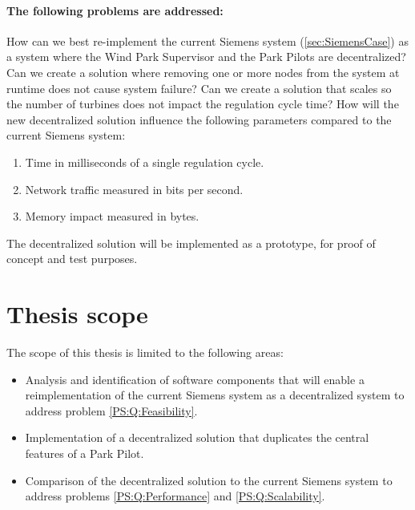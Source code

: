 \paragraph{The following problems are addressed:}
\begin{description} %
	 How can we best re-implement the current Siemens system (\cref{sec:SiemensCase}) as a system where the Wind Park Supervisor and the Park Pilots are decentralized?
	 Can we create a solution where removing one or more nodes from the system at runtime does not cause system failure?
	 Can we create a solution that scales so the number of turbines does not impact the regulation cycle time?
	 How will the new decentralized solution influence the following parameters compared to the current Siemens system:
	\begin{enumerate}
		\item Time in milliseconds of a single regulation cycle.
		\item Network traffic measured in bits per second.
		\item Memory impact measured in bytes.
	\end{enumerate}
\end{description}

The decentralized solution will be implemented as a prototype, for proof of concept and test purposes.

\section{Thesis scope}
\label{sec:thesisScope}
The scope of this thesis is limited to the following areas:

\begin{itemize}
	\item Analysis and identification of software components that will enable a reimplementation of the current Siemens system as a decentralized system to address problem \ref{PS:Q:Feasibility}.
	\item Implementation of a decentralized solution that duplicates the central features of a Park Pilot.
	\item Comparison of the decentralized solution to the current Siemens system to address problems \ref{PS:Q:Performance} and \ref{PS:Q:Scalability}.
\end{itemize}

